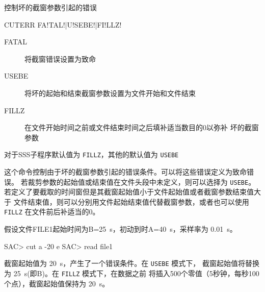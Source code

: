 \label{cmd:cuterr}

控制坏的截窗参数引起的错误

\begin{SACSTX}
CUTERR FA!TAL!|U!SEBE!|FI!LLZ!
\end{SACSTX}

\begin{description}
\item [FATAL] 将截窗错误设置为致命
\item [USEBE] 将坏的起始和结束截窗参数设置为文件开始和文件结束
\item [FILLZ] 在文件开始时间之前或文件结束时间之后填补适当数目的0以弥补
    坏的截窗参数
\end{description}

对于SSS子程序默认值为 \texttt{FILLZ}，其他的默认值为 \texttt{USEBE}

这个命令控制由于坏的截窗参数引起的错误条件。可以将这些错误定义为致命错误。
若裁剪参数的起始值或结束值在文件头段中未定义，则可以选择为 \texttt{USEBE}。
若定义了要截取的时间窗但是其截窗起始值小于文件起始值或者截窗参数结束值大于
文件结束值，则可以分别用文件起始结束值代替截窗参数，或者也可以使用
\texttt{FILLZ} 在文件前后补适当的0。

假设文件FILE1起始时间为B=\SI{25}{s}，初动到时A=\SI{40}{s}，采样率为 \SI{0.01}{s}。
\begin{SACCode}
SAC> cut a -20 e
SAC> read file1
\end{SACCode}
截窗起始值为 \SI{20}{s}，产生了一个错误条件。在 \texttt{USEBE} 模式下，
截窗起始值将替换为 \SI{25}{s}(即B)。在 \texttt{FILLZ} 模式下，在数据之前
将插入500个零值（5秒钟，每秒100个点），截窗起始值保持为 \SI{20}{s}。

